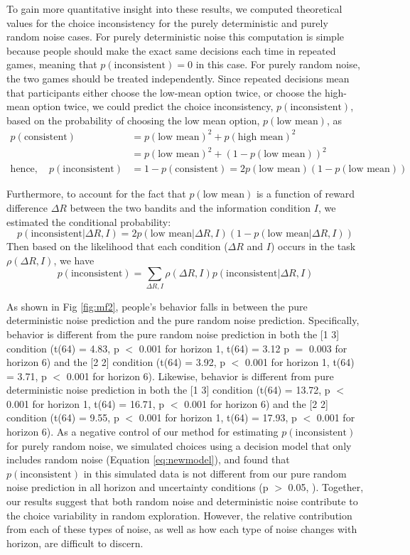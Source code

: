 \documentclass[12pt]{article}
\begin{document}
{To gain more quantitative insight into these results, we computed theoretical values for the choice inconsistency for the purely deterministic and purely random noise cases.  For purely deterministic noise this computation is simple because people should make the exact same decisions each time in repeated games, meaning that $p(\mbox{inconsistent}) = 0$ in this case. For purely random noise, the two games should be treated independently. Since repeated decisions mean that participants either choose the low-mean option twice, or choose the high-mean option twice, we could predict the choice inconsistency, $p(\mbox{inconsistent})$, based on the probability of choosing the low mean option, $p(\mbox{low mean})$, as
\begin{equation*}
	\begin{split}
		p(\mbox{consistent}) &= p(\mbox{low mean})^2 + p(\mbox{high mean})^2\\
		&= p(\mbox{low mean})^2 + (1-p(\mbox{low mean}))^2\\ 
		\mbox{hence},\quad p(\mbox{inconsistent}) &=  
		1 - p(\mbox{consistent}) = 
		2 p(\mbox{low mean})(1-p(\mbox{low mean}))
	\end{split}
\end{equation*}

Furthermore, to account for the fact that $p(\mbox{low mean})$ is a function of reward difference $\Delta R$ between the two bandits and the information condition $I$, we estimated the conditional probability:
	$$p(\mbox{inconsistent}|\Delta R, I) = 2 p(\mbox{low mean}|\Delta R, I)(1-p(\mbox{low mean}|\Delta R, I))$$
	Then based on the likelihood that each condition ($\Delta R$ and $I$) occurs in the task $\rho(\Delta R, I)$, we have
	$$p(\mbox{inconsistent}) = \sum_{\Delta R, I}\rho(\Delta R, I)p(\mbox{inconsistent}|\Delta R, I)$$

As shown in Fig \ref{fig:mf2}, people's behavior falls in between the pure deterministic noise prediction and the pure random noise prediction. Specifically, behavior is different from the pure random noise prediction in both the [1 3] condition (t(64) = 4.83, p $<$ 0.001 for horizon 1, t(64) = 3.12 p $=$ 0.003 for horizon 6) and the [2 2] condition (t(64) = 3.92, p $<$ 0.001 for horizon 1, t(64) = 3.71, p $<$ 0.001 for horizon 6). Likewise, behavior is different from pure deterministic noise prediction in both the [1 3] condition (t(64) = 13.72, p $<$ 0.001 for horizon 1, t(64) = 16.71, p $<$ 0.001 for horizon 6) and the [2 2] condition (t(64) = 9.55, p $<$ 0.001 for horizon 1, t(64) = 17.93, p $<$ 0.001 for horizon 6). As a negative control of our method for estimating $p(\mbox{inconsistent})$ for purely random noise, we simulated choices using a decision model that only includes random noise (Equation \ref{eq:newmodel}), and found that $p(\mbox{inconsistent})$ in this simulated data is not different from our pure random noise prediction in all horizon and uncertainty conditions (p $>$ 0.05, ). Together, our results suggest that both random noise and deterministic noise contribute to the choice variability in random exploration. However, the relative contribution from each of these types of noise, as well as how each type of noise changes with horizon, are difficult to discern.

}
\end{document}

